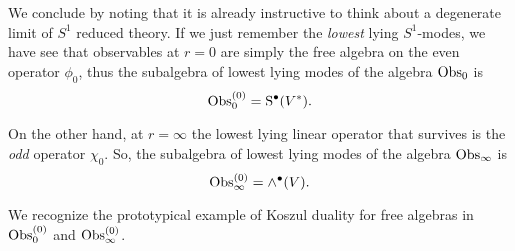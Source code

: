 \documentclass[11pt]{amsart}
\def\brian#1{{\textcolor{blue!65!red}{BRW: {#1}}}}
\begin{document}
%
%
%
%
%

We conclude by noting that it is already instructive to think about a degenerate limit of $S^1$ reduced theory. 
If we just remember the {\em lowest} lying $S^1$-modes, we have see that observables at $r=0$ are simply the free algebra on the even operator $\phi_0$, thus the subalgebra of lowest lying modes of the algebra ${\rm Obs}_0$ is
\[
{\rm Obs}_0^{(0)} = {\rm S}^\bullet(V^*).
\]

On the other hand, at $r=\infty$ the lowest lying linear operator that survives is the {\em odd} operator $\chi_0$.
So, the subalgebra of lowest lying modes of the algebra ${\rm Obs}_\infty$ is
\[
{\rm Obs}_\infty^{(0)} = \wedge^\bullet(V) .
\]

We recognize the prototypical example of Koszul duality for free algebras in ${\rm Obs}_0^{(0)}$ and ${\rm Obs}_\infty^{(0)}$. 
\end{document}
